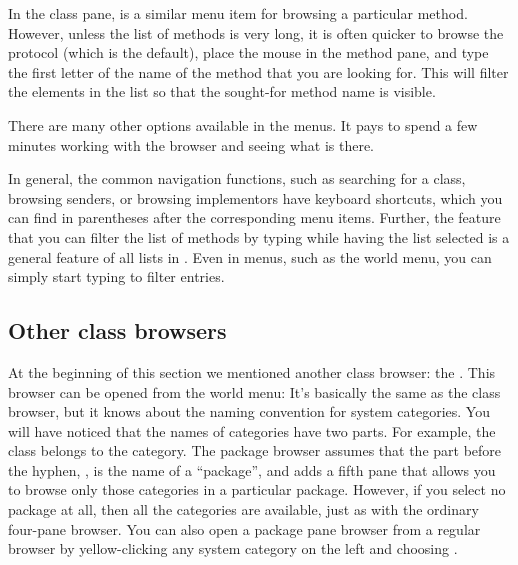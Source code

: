 \documentclass[a4paper,10pt,twoside]{book}
\begin{document}
In the class pane,  is a similar menu item for browsing a particular method.
However, unless the list of methods is very long, it is often quicker to browse the  protocol (which is the default), place the mouse in the method pane, and type the first letter of the name of the method that you are looking for.
This will filter the elements in the list so that the sought-for method name is visible.


There are many other options available in the menus.
It pays to spend a few minutes working with the browser and seeing what is there.


In general, the common navigation functions, such as searching for a class, browsing senders, or browsing implementors have keyboard shortcuts, which you can find in parentheses after the corresponding menu items.
Further, the feature that you can filter the list of methods by typing while having the list selected is a general feature of all lists in \sq.
Even in menus, such as the world menu, you can simply start typing to filter entries.

\subsection{Other class browsers}
\label{sec:otherBrowsers}

At the beginning of this section we mentioned another class browser: the .
This browser can be opened from the world menu: 
It's basically the same as the class browser, but it knows about the naming convention for system categories.
You will have noticed that the names of categories have two parts.
For example, the  class belongs to the  category.
\label{sec:package-names}
The package browser assumes that the part before the hyphen, , is the name of a ``package'', and adds a fifth pane that allows you to browse only those categories in a particular package.
However, if you select no package at all, then all the categories are available, just as with the ordinary four-pane browser.
You can also open a package pane browser from a regular browser by yellow-clicking any system category on the left and choosing .
\end{document}
